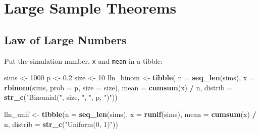 \documentclass[]{book}
\newenvironment{Shaded}{\begin{snugshade}}{\end{snugshade}}
\newcommand{\DataTypeTok}[1]{\textcolor[rgb]{0.13,0.29,0.53}{#1}}
\newcommand{\DecValTok}[1]{\textcolor[rgb]{0.00,0.00,0.81}{#1}}
\newcommand{\FloatTok}[1]{\textcolor[rgb]{0.00,0.00,0.81}{#1}}
\newcommand{\KeywordTok}[1]{\textcolor[rgb]{0.13,0.29,0.53}{\textbf{#1}}}
\newcommand{\NormalTok}[1]{#1}
\newcommand{\OperatorTok}[1]{\textcolor[rgb]{0.81,0.36,0.00}{\textbf{#1}}}
\newcommand{\StringTok}[1]{\textcolor[rgb]{0.31,0.60,0.02}{#1}}
\theoremstyle{definition}
\theoremstyle{definition}
\theoremstyle{definition}
\theoremstyle{remark}
\begin{document}
\hypertarget{large-sample-theorems}{%
\section{Large Sample Theorems}\label{large-sample-theorems}}

\hypertarget{law-of-large-numbers}{%
\subsection{Law of Large Numbers}\label{law-of-large-numbers}}

Put the simulation number, \texttt{x} and \texttt{mean} in a tibble:

\begin{Shaded}
\begin{Highlighting}[]
\NormalTok{sims <-}\StringTok{ }\DecValTok{1000}
\NormalTok{p <-}\StringTok{ }\FloatTok{0.2}
\NormalTok{size <-}\StringTok{ }\DecValTok{10}
\NormalTok{lln_binom <-}\StringTok{ }\KeywordTok{tibble}\NormalTok{(}
  \DataTypeTok{n =} \KeywordTok{seq_len}\NormalTok{(sims),}
  \DataTypeTok{x =} \KeywordTok{rbinom}\NormalTok{(sims, }\DataTypeTok{prob =}\NormalTok{ p, }\DataTypeTok{size =}\NormalTok{ size),}
  \DataTypeTok{mean =} \KeywordTok{cumsum}\NormalTok{(x) }\OperatorTok{/}\StringTok{ }\NormalTok{n,}
  \DataTypeTok{distrib =} \KeywordTok{str_c}\NormalTok{(}\StringTok{"Binomial("}\NormalTok{, size, }\StringTok{", "}\NormalTok{, p, }\StringTok{")"}\NormalTok{))}
\end{Highlighting}
\end{Shaded}

\begin{Shaded}
\begin{Highlighting}[]
\NormalTok{lln_unif <-}
\StringTok{ }\KeywordTok{tibble}\NormalTok{(}\DataTypeTok{n =} \KeywordTok{seq_len}\NormalTok{(sims),}
        \DataTypeTok{x =} \KeywordTok{runif}\NormalTok{(sims),}
        \DataTypeTok{mean =} \KeywordTok{cumsum}\NormalTok{(x) }\OperatorTok{/}\StringTok{ }\NormalTok{n,}
        \DataTypeTok{distrib =} \KeywordTok{str_c}\NormalTok{(}\StringTok{"Uniform(0, 1)"}\NormalTok{))}
\end{Highlighting}
\end{Shaded}
\end{document}
